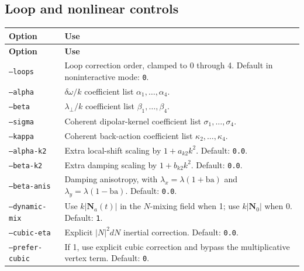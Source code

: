 \documentclass[11pt]{article}
\begin{document}
\subsection{Loop and nonlinear controls}
\begin{longtable}{L{0.28\textwidth}L{0.64\textwidth}}
\toprule
\textbf{Option} & \textbf{Use} \\
\midrule
\endfirsthead
\toprule
\textbf{Option} & \textbf{Use} \\
\midrule
\endhead
\texttt{--loops} & Loop correction order, clamped to 0 through 4. Default in noninteractive mode: \texttt{0}. \\
\texttt{--alpha} & \(\delta\omega/k\) coefficient list \(\alpha_1,\ldots,\alpha_4\). \\
\texttt{--beta} & \(\lambda_\perp/k\) coefficient list \(\beta_1,\ldots,\beta_4\). \\
\texttt{--sigma} & Coherent dipolar-kernel coefficient list \(\sigma_1,\ldots,\sigma_4\). \\
\texttt{--kappa} & Coherent back-action coefficient list \(\kappa_2,\ldots,\kappa_4\). \\
\texttt{--alpha-k2} & Extra local-shift scaling by \(1+a_{k2}k^2\). Default: \texttt{0.0}. \\
\texttt{--beta-k2} & Extra damping scaling by \(1+b_{k2}k^2\). Default: \texttt{0.0}. \\
\texttt{--beta-anis} & Damping anisotropy, with \(\lambda_x=\lambda(1+\mathrm{ba})\) and \(\lambda_y=\lambda(1-\mathrm{ba})\). Default: \texttt{0.0}. \\
\texttt{--dynamic-mix} & Use \(k|\mathbf N_a(t)|\) in the \(N\)-mixing field when 1; use \(k|\mathbf N_0|\) when 0. Default: \texttt{1}. \\
\texttt{--cubic-eta} & Explicit \(|N|^2 dN\) inertial correction. Default: \texttt{0.0}. \\
\texttt{--prefer-cubic} & If 1, use explicit cubic correction and bypass the multiplicative vertex term. Default: \texttt{0}. \\
\bottomrule
\end{longtable}
\end{document}
